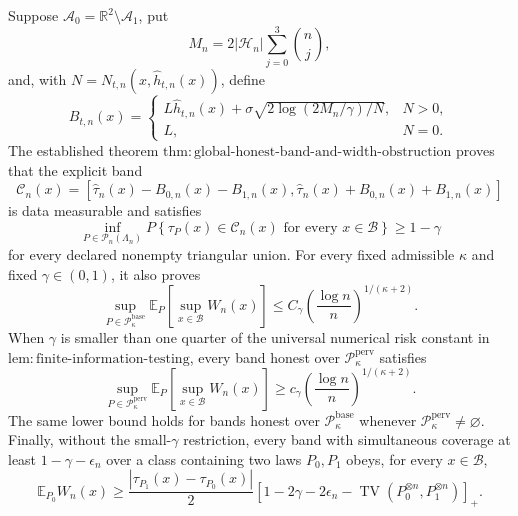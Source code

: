 Suppose \(\mathcal A_0=\mathbb R^2\setminus\mathcal A_1\), put
\[
 M_n=2|\mathcal H_n|\sum_{j=0}^3\binom nj,
\]
and, with \(N=N_{t,n}(x,\widehat h_{t,n}(x))\), define
\[
 B_{t,n}(x)=
 \begin{cases}
 L\widehat h_{t,n}(x)+\sigma\sqrt{2\log(2M_n/\gamma)/N},&N>0,\\
 L,&N=0.
 \end{cases}
\]
The established theorem \(\mathrm{thm:global\text{-}honest\text{-}band\text{-}and\text{-}width\text{-}obstruction}\) proves that the explicit band
\[
 \mathcal C_n(x)=
 \left[\widehat\tau_n(x)-B_{0,n}(x)-B_{1,n}(x),
 \widehat\tau_n(x)+B_{0,n}(x)+B_{1,n}(x)\right]
\]
is data measurable and satisfies
\[
 \inf_{P\in\mathcal P_n(\Lambda_n)}
 P\!\left\{\tau_P(x)\in\mathcal C_n(x)
 \text{ for every }x\in\mathcal B\right\}\ge 1-\gamma
\]
for every declared nonempty triangular union. For every fixed admissible \(\kappa\) and fixed \(\gamma\in(0,1)\), it also proves
\[
 \sup_{P\in\mathcal P_{\kappa}^{\mathrm{base}}}
 \mathbb E_P\!\left[\sup_{x\in\mathcal B}W_n(x)\right]
 \le C_\gamma\left(\frac{\log n}{n}\right)^{1/(\kappa+2)}.
\]
When \(\gamma\) is smaller than one quarter of the universal numerical risk constant in \(\mathrm{lem:finite\text{-}information\text{-}testing}\), every band honest over \(\mathcal P_{\kappa}^{\mathrm{perv}}\) satisfies
\[
 \sup_{P\in\mathcal P_{\kappa}^{\mathrm{perv}}}
 \mathbb E_P\!\left[\sup_{x\in\mathcal B}W_n(x)\right]
 \ge c_\gamma\left(\frac{\log n}{n}\right)^{1/(\kappa+2)}.
\]
The same lower bound holds for bands honest over \(\mathcal P_{\kappa}^{\mathrm{base}}\) whenever \(\mathcal P_{\kappa}^{\mathrm{perv}}\ne\varnothing\). Finally, without the small-\(\gamma\) restriction, every band with simultaneous coverage at least \(1-\gamma-\epsilon_n\) over a class containing two laws \(P_0,P_1\) obeys, for every \(x\in\mathcal B\),
\[
 \mathbb E_{P_0}W_n(x)\ge
 \frac{|\tau_{P_1}(x)-\tau_{P_0}(x)|}{2}
 \left[1-2\gamma-2\epsilon_n-
 \operatorname{TV}(P_0^{\otimes n},P_1^{\otimes n})\right]_+.
\]